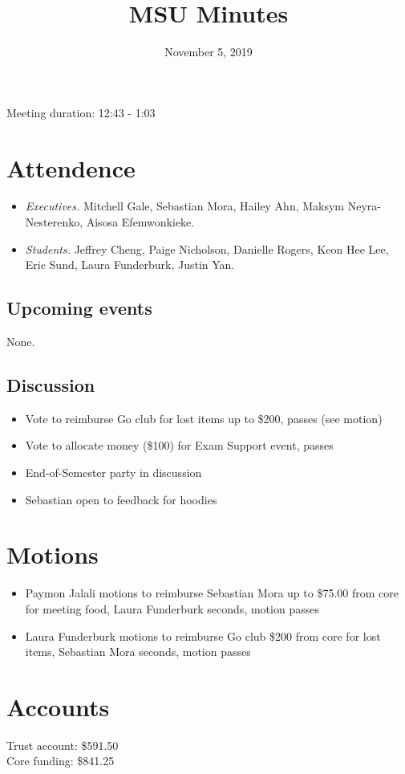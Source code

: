 \documentclass[12pt]{article}
\title{MSU Minutes}
\date{November 5, 2019}
\begin{document}
\maketitle

Meeting duration: 12:43 - 1:03

\section*{Attendence}
\begin{itemize}
\item \textit{Executives.} Mitchell Gale, Sebastian Mora, Hailey Ahn, Maksym Neyra-Nesterenko, Aisosa Efemwonkieke.
\item \textit{Students.} Jeffrey Cheng, Paige Nicholson, Danielle Rogers, Keon Hee Lee, Eric Sund, Laura Funderburk, Justin Yan.
\end{itemize}

\subsection*{Upcoming events}
None.

\subsection*{Discussion}
\begin{itemize}
\item Vote to reimburse Go club for lost items up to \$200, passes (see motion)
\item Vote to allocate money (\$100) for Exam Support event, passes
\item End-of-Semester party in discussion
\item Sebastian open to feedback for hoodies
\end{itemize}

\section*{Motions}
\begin{itemize}
\item Paymon Jalali motions to reimburse Sebastian Mora up to \$75.00 from core for meeting food, Laura Funderburk seconds, motion passes
\item Laura Funderburk motions to reimburse Go club \$200 from core for lost items, Sebastian Mora seconds, motion passes
\end{itemize}

\section*{Accounts}

Trust account: \$591.50 \\
Core funding: \$841.25 \\
\end{document}
